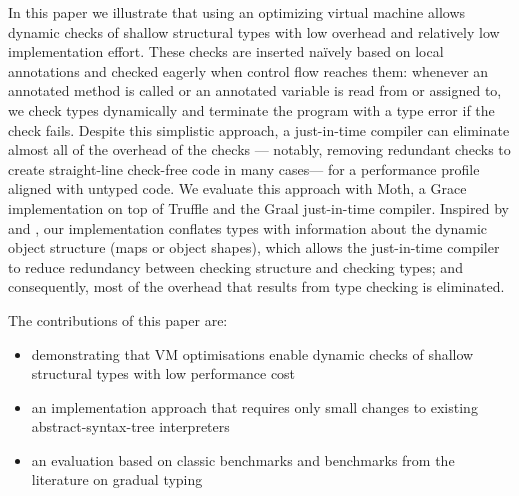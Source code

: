 In this paper we illustrate that using an optimizing virtual machine allows dynamic
checks of shallow structural types with low overhead and relatively low
implementation effort. These checks are inserted na\"ively based on local
annotations and checked eagerly when control flow reaches them: 
whenever an annotated method is called or
an annotated variable is read from or assigned to,
we check types dynamically and
terminate the program with a type error if the check fails.
Despite this simplistic approach, a just-in-time compiler can eliminate
almost all of the overhead of the checks ---%
notably, removing redundant checks to create straight-line check-free code in many cases---%
for a performance profile aligned with untyped code.
%
We evaluate this approach with Moth,
a Grace implementation on top of Truffle
and the Graal just-in-time compiler\citep{Wurthinger2013,Wurthinger:2017:PPE}.
Inspired by \citet{Richards2017} and \citet{Bauman2017},
our implementation conflates types
with information about the dynamic object structure 
(maps\citep{Self} or object shapes\citep{woss2014object}), 
which allows the just-in-time compiler
to reduce redundancy between checking structure
and checking types; and consequently, most of the overhead 
that results from type checking is eliminated.



The contributions of this paper are:

\begin{itemize}
\item demonstrating that VM optimisations enable
        dynamic checks of shallow structural types with low
        performance cost
\item an implementation approach that requires
      only small changes to existing abstract-syntax-tree interpreters
\item an evaluation based on classic benchmarks
      and benchmarks from the literature on gradual typing
\end{itemize}
